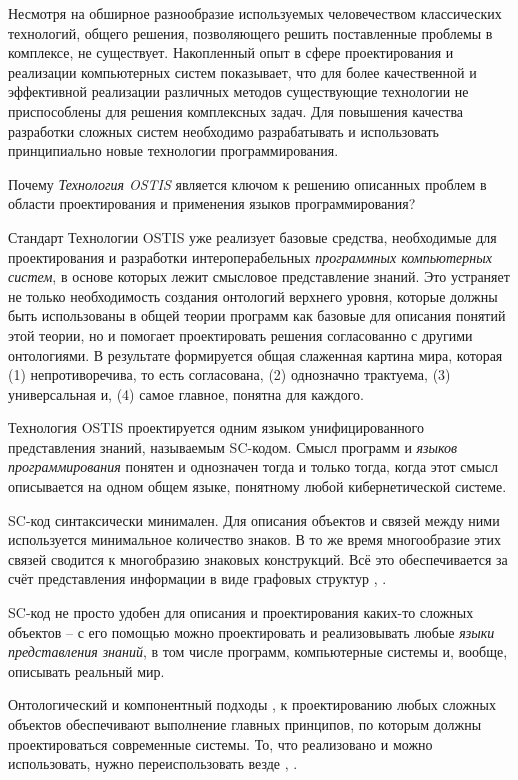 Несмотря на обширное разнообразие используемых человечеством классических технологий, общего решения, позволяющего решить поставленные проблемы в комплексе, не существует. Накопленный опыт в сфере проектирования и реализации компьютерных систем показывает, что для более качественной и эффективной реализации различных методов существующие технологии не приспособлены для решения комплексных задач. Для повышения качества разработки сложных систем необходимо разрабатывать и использовать принципиально новые технологии программирования.

Почему \textit{Технология OSTIS} является ключом к решению описанных проблем в области проектирования и применения языков программирования?
\begin{textitemize}
    \item {Стандарт Технологии OSTIS \cite{Standard2021} уже реализует базовые средства, необходимые для проектирования и разработки интероперабельных \textit{программных компьютерных систем}, в основе которых лежит смысловое представление знаний. Это устраняет не только необходимость создания онтологий верхнего уровня, которые должны быть использованы в общей теории программ как базовые для описания понятий этой теории, но и помогает проектировать решения согласованно с другими онтологиями. В результате формируется общая слаженная картина мира, которая (1) непротиворечива, то есть согласована, (2) однозначно трактуема, (3) универсальная и, (4) самое главное, понятна для каждого.}
    \item {Технология OSTIS проектируется одним языком унифицированного представления знаний, называемым SC-кодом. Смысл программ и \textit{языков программирования} понятен и однозначен тогда и только тогда, когда этот смысл описывается на одном общем языке, понятному любой кибернетической системе.}
    \item {SC-код синтаксически минимален. Для описания объектов и связей между ними используется минимальное количество знаков. В то же время многообразие этих связей сводится к многобразию знаковых конструкций. Всё это обеспечивается за счёт представления информации в виде графовых структур \cite{Kasyanov2003}, \cite{Petrov1978}.}
    \item {SC-код не просто удобен для описания и проектирования каких-то сложных объектов -- с его помощью можно проектировать и реализовывать любые \textit{языки представления знаний}, в том числе программ, компьютерные системы и, вообще, описывать реальный мир.}
    \item {Онтологический и компонентный подходы \cite{Sales2022}, \cite{Samaa2020} к проектированию любых сложных объектов обеспечивают выполнение главных принципов, по которым должны проектироваться современные системы. То, что реализовано и можно использовать, нужно переиспользовать везде \cite{O4IS2007}, \cite{Molorodov2019}.}
\end{textitemize}


